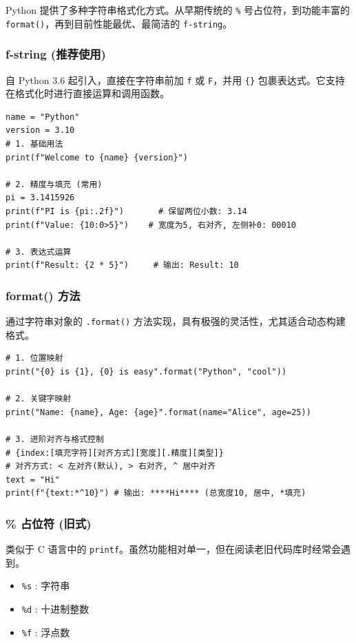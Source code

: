 \documentclass{article}
\begin{document}
Python 提供了多种字符串格式化方式。从早期传统的 \texttt{\%} 号占位符，到功能丰富的 \texttt{format()}，再到目前性能最优、最简洁的 \texttt{f-string}。

\subsubsection{f-string (推荐使用)}
自 Python 3.6 起引入，直接在字符串前加 \texttt{f} 或 \texttt{F}，并用 \texttt{\{\}} 包裹表达式。它支持在格式化时进行直接运算和调用函数。

\begin{lstlisting}
name = "Python"
version = 3.10
# 1. 基础用法
print(f"Welcome to {name} {version}")

# 2. 精度与填充 (常用)
pi = 3.1415926
print(f"PI is {pi:.2f}")       # 保留两位小数: 3.14
print(f"Value: {10:0>5}")    # 宽度为5, 右对齐, 左侧补0: 00010

# 3. 表达式运算
print(f"Result: {2 * 5}")     # 输出: Result: 10
\end{lstlisting}

\subsubsection{format() 方法}
通过字符串对象的 \texttt{.format()} 方法实现，具有极强的灵活性，尤其适合动态构建格式。

\begin{lstlisting}
# 1. 位置映射
print("{0} is {1}, {0} is easy".format("Python", "cool"))

# 2. 关键字映射
print("Name: {name}, Age: {age}".format(name="Alice", age=25))

# 3. 进阶对齐与格式控制
# {index:[填充字符][对齐方式][宽度][.精度][类型]}
# 对齐方式: < 左对齐(默认), > 右对齐, ^ 居中对齐
text = "Hi"
print(f"{text:*^10}") # 输出: ****Hi**** (总宽度10, 居中, *填充)
\end{lstlisting}

\subsubsection{\% 占位符 (旧式)}
类似于 C 语言中的 \texttt{printf}。虽然功能相对单一，但在阅读老旧代码库时经常会遇到。

\begin{itemize}
    \item \texttt{\%s} : 字符串
    \item \texttt{\%d} : 十进制整数
    \item \texttt{\%f} : 浮点数
\end{itemize}
\end{document}
